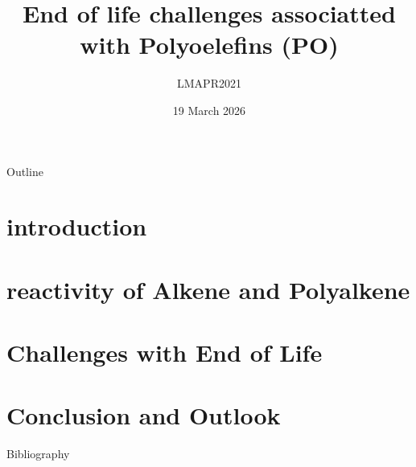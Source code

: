 \documentclass{Styles/beamer-style}
\author[F. Clinquart]{}
\title{End of life challenges associatted with Polyoelefins (PO)}
\subtitle{LMAPR2021}
\date{19 March 2026}
\begin{document}
\begin{frame}
    \titlepage
\end{frame}

\begin{frame}{Outline}
    \tableofcontents
\end{frame}

\section[Introduction]{introduction}
    
\section[Reactivity]{reactivity of Alkene and Polyalkene}
    
\section[End of Life]{Challenges with End of Life}
    
\section[Conclusion]{Conclusion and Outlook}
    

\begin{frame}{Bibliography}
    \printbibliography[heading=none]
\end{frame}

\end{document}
